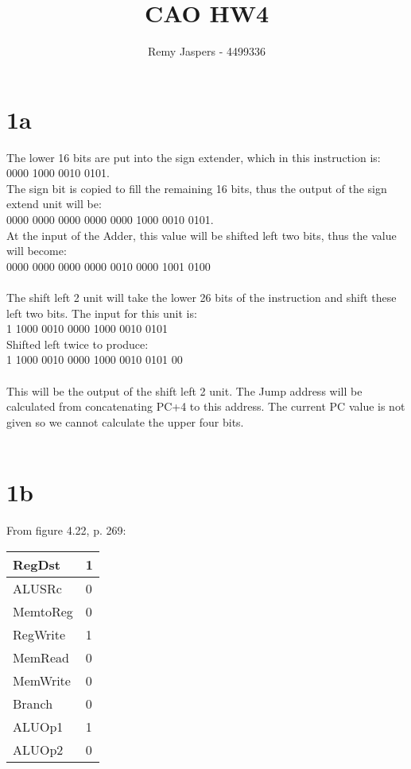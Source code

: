 \documentclass[10pt,a4paper]{article}
\author{Remy Jaspers - 4499336}
\title{CAO HW4}
\begin{document}
	\maketitle
	\section*{1a}
	The lower 16 bits are put into the sign extender, which in this instruction is: \\
	0000 1000 0010 0101. \\
	The sign bit is copied to fill the remaining 16 bits, thus the output of the sign extend unit will be:\\
	0000 0000 0000 0000 0000 1000 0010 0101. \\
	At the input of the Adder, this value will be shifted left two bits, thus the value will become:\\
	0000 0000 0000 0000 0010 0000 1001 0100\\\\
	The shift left 2 unit will take the lower 26 bits of the instruction and shift these left two bits. The input for this unit is:\\
	1 1000 0010 0000 1000 0010 0101 \\
	Shifted left twice to produce:\\
	1 1000 0010 0000 1000 0010 0101 00\\\\
	This will be the output of the shift left 2 unit. The Jump address will be calculated from concatenating PC+4 to this address. The current PC value is not given so we cannot calculate the upper four bits.\\\\

	\section*{1b}
	From figure 4.22, p. 269:
	\begin{table}[h]
		\centering
		\label{my-label}
		\begin{tabular}{|l|l|}
			\hline
		RegDst	&  1\\ \hline
		ALUSRc	& 0 \\ \hline
		MemtoReg & 0  \\ \hline
		RegWrite&  1 \\ \hline
		MemRead 	&  0\\ \hline
		MemWrite	&  0 \\ \hline
		Branch 	&  0\\  \hline
	 	ALUOp1	&  1\\ \hline
  		ALUOp2	&  0\\  \hline \end{tabular}
	\end{table}
\end{document}
